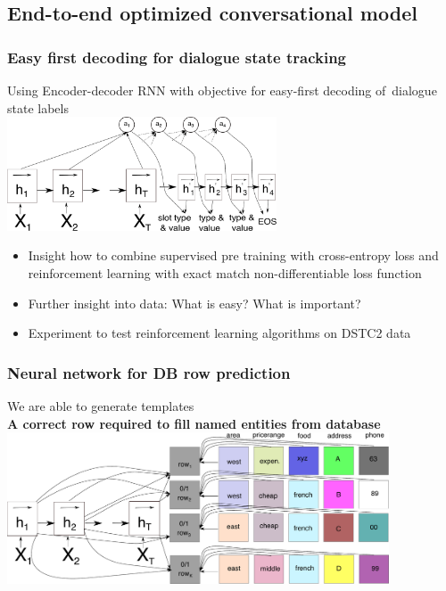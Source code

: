 \documentclass[10pt, compress,british,xcolor={svgnames,dvipsnames,x11names},trans]{beamer}
\begin{document}
\subsection{End-to-end optimized conversational model}  %

\begin{frame}\frametitle{Easy first decoding for dialogue state tracking}
    Using Encoder-decoder RNN with objective for easy-first decoding of~dialogue state labels  \\
    \includegraphics[width=0.6\textwidth]{encdec_easy}
    \begin{itemize}
        \item Insight how to combine supervised pre training with cross-entropy loss and reinforcement learning with exact match non-differentiable loss function
        \item Further insight into data: What is easy? What is important?
        \item Experiment to test reinforcement learning algorithms on DSTC2 data
    \end{itemize}
\end{frame}

\begin{frame}\frametitle{Neural network for DB row prediction}
    \begin{center}
    We are able to generate templates \\
    {\bf A correct row required to fill named entities from database}
        \vfill
    \includegraphics[width=0.85\textwidth]{./e2end_dbclassifiers}
    \end{center}
\end{frame}
\end{document}
